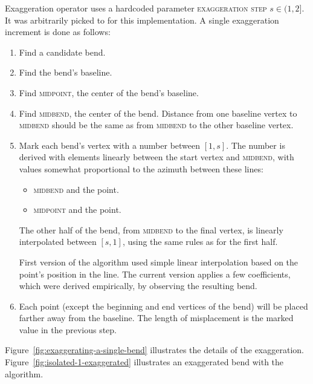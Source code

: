 \documentclass[a4paper]{article}
\begin{document}
Exaggeration operator uses a hardcoded parameter \textsc{exaggeration step} $s
\in (1,2]$. It was arbitrarily picked to {\exaggerationEnthusiasm} for this
implementation. A single exaggeration increment is done as follows:

\begin{enumerate}
    \item Find a candidate bend.
    \item Find the bend's baseline.
    \item Find \textsc{midpoint}, the center of the bend's baseline.

    \item Find \textsc{midbend}, the center of the bend. Distance from one
        baseline vertex to \textsc{midbend} should be the same as from
        \textsc{midbend} to the other baseline vertex.

    \item Mark each bend's vertex with a number between $[1,s]$. The number is
        derived with elements linearly between the start vertex and
        \textsc{midbend}, with values somewhat proportional to the azimuth
        between these lines:

        \begin{itemize}
            \item \textsc{midbend} and the point.
            \item \textsc{midpoint} and the point.
        \end{itemize}

        The other half of the bend, from \textsc{midbend} to the final vertex,
        is linearly interpolated between $[s,1]$, using the same rules as for
        the first half.

        First version of the algorithm used simple linear interpolation based
        on the point's position in the line. The current version applies a few
        coefficients, which were derived empirically, by observing the
        resulting bend.

    \item Each point (except the beginning and end vertices of the bend) will
        be placed farther away from the baseline. The length of misplacement is
        the marked value in the previous step.

\end{enumerate}

Figure~\ref{fig:exaggerating-a-single-bend} illustrates the details of the
exaggeration. Figure~\ref{fig:isolated-1-exaggerated} illustrates an
exaggerated bend with the algorithm.
\end{document}
